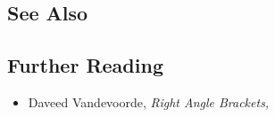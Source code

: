 \hspace{\fill}

\subsection[See Also]{See Also}\label{see-also}

\hspace{\fill}

\subsection[Further Reading]{Further Reading}\label{further-reading}

\begin{itemize}
\item{Daveed Vandevoorde, \textit{Right Angle Brackets,} \cite{vandevoorde05}}
\end{itemize}


